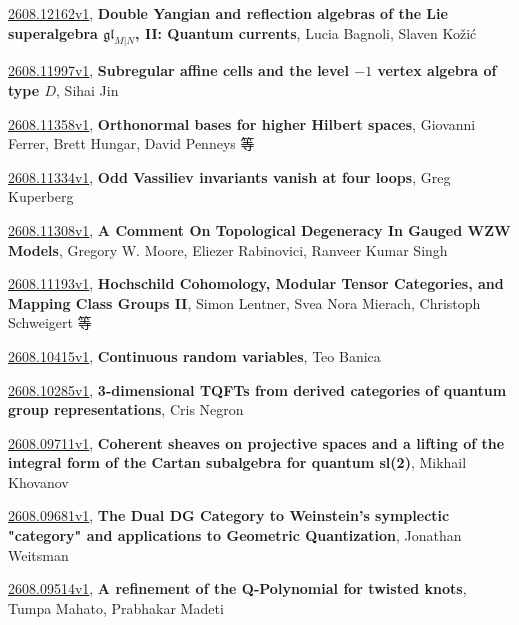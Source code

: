 \documentclass[9pt, a4paper]{article}
\theoremstyle{plain}
\theoremstyle{definition}
\theoremstyle{remark}
\newcommand{\arxiv}[3]{\href{https://arxiv.org/abs/#1}{#1}, \textbf{\textcolor{arxivblue}{#2}}, #3}
\begin{document}
\arxiv{2608.12162v1}{Double Yangian and reflection algebras of the Lie superalgebra $\mathfrak{gl}_{M|N}$, II: Quantum currents}{Lucia Bagnoli, Slaven Kožić}

\arxiv{2608.11997v1}{Subregular affine cells and the level $-1$ vertex algebra of type $D$}{Sihai Jin}

\arxiv{2608.11358v1}{Orthonormal bases for higher Hilbert spaces}{Giovanni Ferrer, Brett Hungar, David Penneys 等}

\arxiv{2608.11334v1}{Odd Vassiliev invariants vanish at four loops}{Greg Kuperberg}

\arxiv{2608.11308v1}{A Comment On Topological Degeneracy In Gauged WZW Models}{Gregory W. Moore, Eliezer Rabinovici, Ranveer Kumar Singh}

\arxiv{2608.11193v1}{Hochschild Cohomology, Modular Tensor Categories, and Mapping Class Groups II}{Simon Lentner, Svea Nora Mierach, Christoph Schweigert 等}

\arxiv{2608.10415v1}{Continuous random variables}{Teo Banica}

\arxiv{2608.10285v1}{3-dimensional TQFTs from derived categories of quantum group representations}{Cris Negron}

\arxiv{2608.09711v1}{Coherent sheaves on projective spaces and a lifting of the integral form of the Cartan subalgebra for quantum sl(2)}{Mikhail Khovanov}

\arxiv{2608.09681v1}{The Dual DG Category to Weinstein's symplectic "category" and applications to Geometric Quantization}{Jonathan Weitsman}

\arxiv{2608.09514v1}{A refinement of the Q-Polynomial for twisted knots}{Tumpa Mahato, Prabhakar Madeti}

\end{document}
